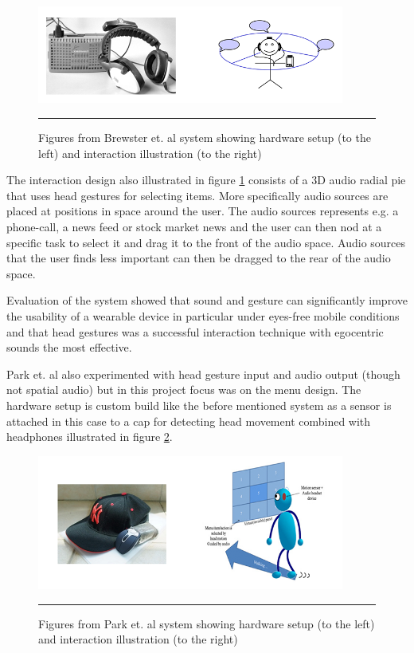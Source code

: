 \begin{figure}[htbp]
	\centering
		\includegraphics[width=0.9\textwidth,height=\textheight,keepaspectratio]{./Figures/brewster-system.png}
		\rule{35em}{0.5pt}
	\caption[Brewster system]{Figures from Brewster et. al \cite{brewster_multimodaleyes-freeinteraction_2003} system showing hardware setup (to the left) and interaction illustration (to the right)}
	\label{fig:brewster}
\end{figure}

The interaction design also illustrated in figure \ref{fig:brewster} consists of a 3D audio radial pie that uses head gestures for selecting items. More specifically audio sources are placed at positions in space around the user. The audio sources represents e.g. a phone-call, a news feed or stock market news and the user can then nod at a specific task to select it and drag it to the front of the audio space. Audio sources that the user finds less important can then be dragged to the rear of the audio space.

Evaluation of the system showed that sound and gesture can significantly improve the usability of a wearable device in particular under eyes-free mobile conditions and that head gestures was a successful interaction technique with egocentric sounds the most effective.


Park et. al \cite{park_gaze-directed_2011} also experimented with head gesture input and audio output (though not spatial audio) but in this project focus was on the menu design. The hardware setup is custom build like the before mentioned system as a sensor is attached in this case to a cap for detecting head movement combined with headphones illustrated in figure \ref{fig:park}.

\begin{figure}[htbp]
	\centering
		\includegraphics[width=0.9\textwidth,height=\textheight,keepaspectratio]{./Figures/park-system.png}
		\rule{35em}{0.5pt}
	\caption[Park system]{Figures from Park et. al \cite{park_gaze-directed_2011} system showing hardware setup (to the left) and interaction illustration (to the right)}
	\label{fig:park}
\end{figure}

